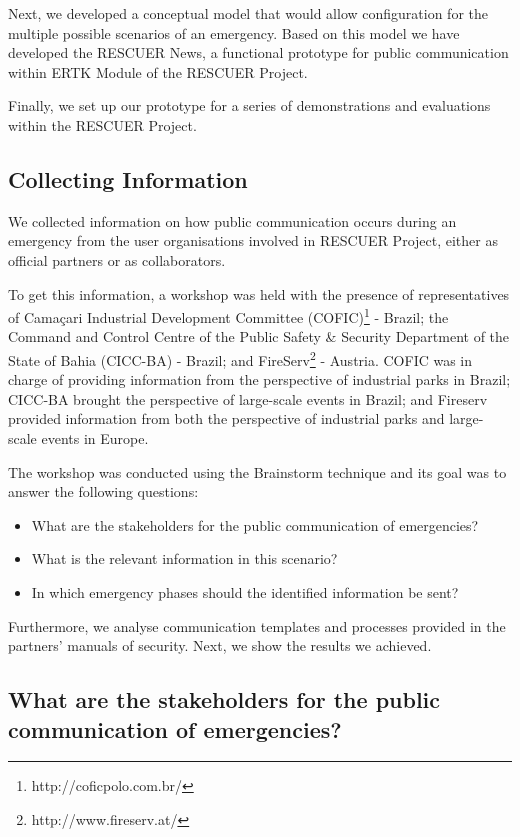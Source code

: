 Next, we developed a conceptual model that would allow configuration for the multiple possible scenarios of an emergency. Based on this model we have developed the RESCUER News, a functional prototype for public communication within ERTK Module of the RESCUER Project.

Finally, we set up our prototype for a series of demonstrations and evaluations within the RESCUER Project.

\subsection{Collecting Information}

We collected information on how public communication occurs during an emergency \citep{pereirachallenges} from the user organisations involved in RESCUER Project, either as official partners or as collaborators. 

To get this information, a workshop was held with the presence of representatives of Camaçari Industrial Development Committee (COFIC)\footnote{http://coficpolo.com.br/} - Brazil; the Command and Control Centre of the Public Safety \& Security Department of the State of Bahia (CICC-BA) - Brazil; and FireServ\footnote{http://www.fireserv.at/} - Austria. COFIC was in charge of providing information from the perspective of industrial parks in Brazil; CICC-BA brought the perspective of large-scale events in Brazil; and Fireserv provided information from both the perspective of industrial parks and large-scale events in Europe.

The workshop was conducted using the Brainstorm technique \citep{diehl1991productivity} and its goal was to answer the following questions:

\begin{itemize}
   \item What are the stakeholders for the public communication of emergencies?
   \item What is the relevant information in this scenario?
   \item In which emergency phases should the identified information be sent?
\end{itemize}

Furthermore, we analyse communication templates and processes provided in the partners’ manuals of security. Next, we show the results we achieved.

\subsection*{What are the stakeholders for the public communication of emergencies?}

